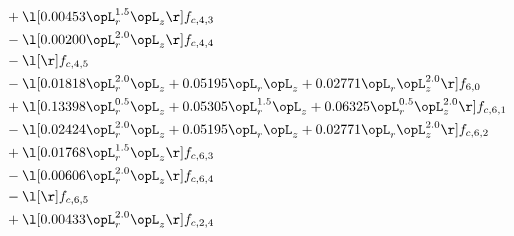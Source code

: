 \begin{alignat}{2}
& + \l[  0.00453 \opL_r^{1.5} \opL_z  \r] f_{c,4,3} \nonumber \\ 
& - \l[  0.00200 \opL_r^{2.0} \opL_z  \r] f_{c,4,4} \nonumber \\ 
& - \l[  \r] f_{c,4,5} \nonumber \\ 
& - \l[  0.01818 \opL_r^{2.0} \opL_z +  0.05195 \opL_r \opL_z +  0.02771 \opL_r \opL_z^{2.0}  \r] f_{6,0} \nonumber \\ 
& + \l[  0.13398 \opL_r^{0.5} \opL_z +  0.05305 \opL_r^{1.5} \opL_z +  0.06325 \opL_r^{0.5} \opL_z^{2.0}  \r] f_{c,6,1} \nonumber \\ 
& - \l[  0.02424 \opL_r^{2.0} \opL_z +  0.05195 \opL_r \opL_z +  0.02771 \opL_r \opL_z^{2.0}  \r] f_{c,6,2} \nonumber \\ 
& + \l[  0.01768 \opL_r^{1.5} \opL_z  \r] f_{c,6,3} \nonumber \\ 
& - \l[  0.00606 \opL_r^{2.0} \opL_z  \r] f_{c,6,4} \nonumber \\ 
& - \l[  \r] f_{c,6,5} \nonumber \\ 
& + \l[  0.00433 \opL_r^{2.0} \opL_z  \r] f_{c,2,4} \nonumber \\ 
\end{alignat} 


